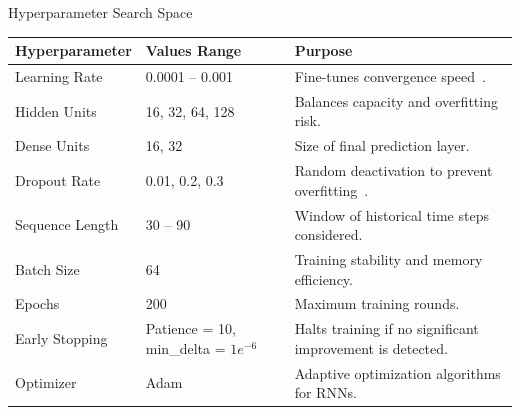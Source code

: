 \begin{frame}[label=hyperparamconfig, shrink]{Hyperparameter Search Space}
\centering
\begin{table}[h]
\renewcommand{\arraystretch}{1.7} 

\begin{tabular}{p{3cm}p{3.5cm}p{6.5cm}}
\hline
\textbf{Hyperparameter} & \textbf{Values Range} & \textbf{Purpose} \\
\hline\hline
Learning Rate & 0.0001 – 0.001 & Fine-tunes convergence speed~\parencite{parmar2018stock}.\\
Hidden Units & 16, 32, 64, 128 & Balances capacity and overfitting risk.\\
Dense Units & 16, 32 & Size of final prediction layer.\\
Dropout Rate & \alert{0.01}, 0.2, 0.3 & Random deactivation to prevent overfitting~\parencite{agrawal2022StockPrediction}.\\
Sequence Length & 30 – 90 & Window of historical time steps considered.\\
Batch Size & 64 & Training stability and memory efficiency.\\
Epochs & 200 & Maximum training rounds.\\
Early Stopping & Patience = 10, min\_delta = $1e^{-6}$ & Halts training if no significant improvement is detected.\\
Optimizer & Adam & Adaptive optimization algorithms for RNNs.\\
\hline
\end{tabular}
\end{table}

\end{frame}

